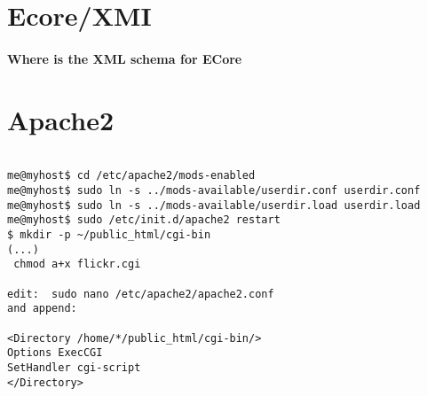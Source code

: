 \documentclass[12pt]{article}
\begin{document}
\section{Ecore/XMI}
\paragraph{Where is the XML schema for ECore}

\section{Apache2}

\begin{lstlisting}

me@myhost$ cd /etc/apache2/mods-enabled
me@myhost$ sudo ln -s ../mods-available/userdir.conf userdir.conf
me@myhost$ sudo ln -s ../mods-available/userdir.load userdir.load
me@myhost$ sudo /etc/init.d/apache2 restart 
$ mkdir -p ~/public_html/cgi-bin
(...)
 chmod a+x flickr.cgi
 
edit:  sudo nano /etc/apache2/apache2.conf
and append:

<Directory /home/*/public_html/cgi-bin/>
Options ExecCGI
SetHandler cgi-script
</Directory>
\end{lstlisting}
\end{document}
